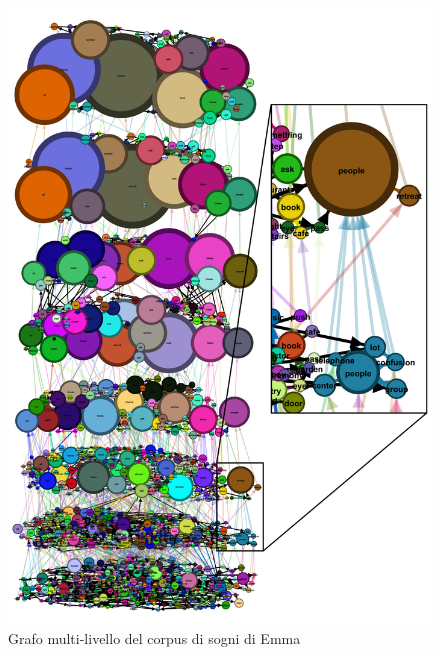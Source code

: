 \begin{figure}
    \centering
    \includegraphics[width=1\textwidth]{Immagini/mlg_emma_focus_example}
    \caption{Grafo multi-livello del corpus di sogni di Emma}
    \label{fig:mlg-emma-example}
\end{figure}
